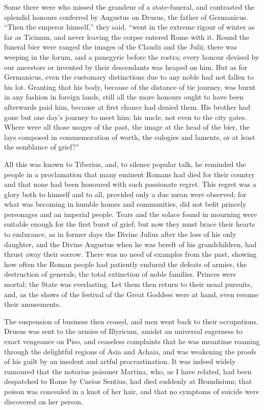 
Some there were who missed the grandeur of a state-funeral, and contrasted the splendid honours conferred by Augustus on Drusus, the father of Germanicus. ``Then the emperor himself,'' they said, ``went in the extreme rigour of winter as far as Ticinum, and never leaving the corpse entered Rome with it. Round the funeral bier were ranged the images of the Claudii and the Julii; there was weeping in the forum, and a panegyric before the rostra; every honour devised by our ancestors or invented by their descendants was heaped on him. But as for Germanicus, even the customary distinctions due to any noble had not fallen to his lot. Granting that his body, because of the distance of tie journey, was burnt in any fashion in foreign lands, still all the more honours ought to have been afterwards paid him, because at first chance had denied them. His brother had gone but one day's journey to meet him; his uncle, not even to the city gates. Where were all those usages of the past, the image at the head of the bier, the lays composed in commemoration of worth, the eulogies and laments, or at least the semblance of grief?''


All this was known to Tiberius, and, to silence popular talk, he reminded the people in a proclamation that many eminent Romans had died for their country and that none had been honoured with such passionate regret. This regret was a glory both to himself and to all, provided only a due mean were observed; for what was becoming in humble homes and communities, did not befit princely personages and an imperial people. Tears and the solace found in mourning were suitable enough for the first burst of grief; but now they must brace their hearts to endurance, as in former days the Divine Julius after the loss of his only daughter, and the Divine Augustus when he was bereft of his grandchildren, had thrust away their sorrow. There was no need of examples from the past, showing how often the Roman people had patiently endured the defeats of armies, the destruction of generals, the total extinction of noble families. Princes were mortal; the State was everlasting. Let them then return to their usual pursuits, and, as the shows of the festival of the Great Goddess were at hand, even resume their amusements.


The suspension of business then ceased, and men went back to their occupations. Drusus was sent to the armies of Illyricum, amidst an universal eagerness to exact vengeance on Piso, and ceaseless complaints that he was meantime roaming through the delightful regions of Asia and Achaia, and was weakening the proofs of his guilt by an insolent and artful procrastination. It was indeed widely rumoured that the notorius poisoner Martina, who, as I have related, had been despatched to Rome by Cneius Sentius, had died suddenly at Brundisium; that poison was concealed in a knot of her hair, and that no symptoms of suicide were discovered on her person.

